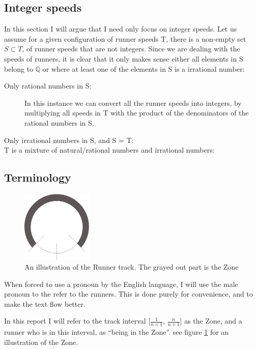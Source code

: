 \subsection{Integer speeds}
\label{integerSpeeds}
In this section I will argue that I need only focus on integer speeds.
Let us assume for a given configuration of runner speeds T, there is a non-empty set $S \subset T$, of runner speeds that are not integers. Since we are dealing with the speeds of runners, it is clear that it only makes sense either all elements in S belong to $\mathbb{Q}$ or where at least one of the elements in S is a irrational number:
\begin{description}
\item[Only rational numbers in S:] In this instance we can convert all the runner speeds into integers, by multiplying all speeds in T with the product of the denominators of the rational numbers in S.
\item[Only irrational numbers in S, and S = T:]

\item[T is a mixture of natural/rational numbers and irrational numbers:]

\end{description}

\subsection{Terminology}
\label{Termonolgy}
\begin{figure}[H]
  \centering
  \includegraphics[width=0.3\textwidth, angle=90]{./images/circleZoneEPS}
  \caption{\label{circleZoneImg}An illustration of the Runner track. The grayed out part is the Zone}
\end{figure}

When forced to use a pronoun by the English language, I will use the male pronoun to the refer to the runners. This is done purely for convenience, and to make the text flow better.

\begin{defi}
\label{def:theZone}
In this report I will refer to the track interval [$\frac{1}{n + 1}$, $\frac{n}{n+1}$] as the Zone, and a runner who is in this interval, as ``being in the Zone''. see figure \ref{circleZoneImg} for an illustration of the Zone.
\end{defi}

